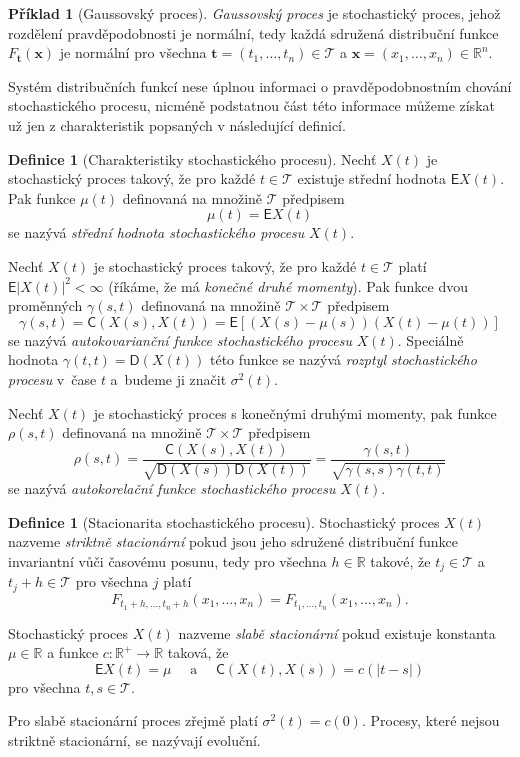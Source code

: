 \documentclass[a4paper,12pt]{report}
\theoremstyle{definition} \newtheorem{definice}[veta]{Definice}
\newtheorem{priklad}{Příklad}
\theoremstyle{remark}
\begin{document}
\begin{priklad}[Gaussovský proces]
\textit{Gaussovský proces} je stochastický proces, jehož rozdělení pravděpodobnosti je normální, tedy každá sdružená distribuční funkce $F_{\boldsymbol{t}}(\boldsymbol{x})$ je normální pro všechna $\boldsymbol{t}=(t_1,\dots,t_n)\in \mathcal{T}$ a $\boldsymbol{x}=(x_1,\dots,x_n)\in \mathbb{R}^n$.
\end{priklad}

Systém distribučních funkcí nese úplnou informaci o pravděpodobnostním chování stochastického procesu, nicméně podstatnou část této informace můžeme získat už jen z charakteristik popsaných v následující definicí.

\begin{definice}[Charakteristiky stochastického procesu]
Nechť $X(t)$ je stochastický proces takový, že pro každé $t\in \mathcal{T}$ existuje střední hodnota $\mathsf{E}{X(t)}$.
Pak funkce $\mu(t)$ definovaná na množině $\mathcal{T}$ předpisem
$$\mu(t)=\mathsf{E}{X(t)}$$
se nazývá \textit{střední hodnota stochastického procesu} $X(t)$.

Nechť $X(t)$ je stochastický proces takový, že pro každé $t\in\mathcal{T}$ platí $\mathsf{E}{|X(t)|^2<\infty}$ (říkáme, že má \textit{konečné druhé momenty}).
Pak funkce dvou proměnných $\gamma(s,t)$ definovaná na množině $\mathcal{T}\times \mathcal{T}$ předpisem
$$\gamma(s,t)=\mathsf{C}(X(s),X(t))=\mathsf{E}{\left[(X(s)-\mu(s))(X(t)-\mu(t))\right]}$$
se nazývá \textit{autokovarianční funkce stochastického procesu} $X(t)$.  
Speciálně hodnota $\gamma(t,t)=\mathsf{D}(X(t))$ této funkce se nazývá \textit{rozptyl stochastického procesu} v~čase $t$ a~budeme ji značit ${\sigma^2(t)}$.

Nechť $X(t)$ je stochastický proces s konečnými druhými momenty,
pak funkce $\rho(s,t)$ definovaná na množině $\mathcal{T}\times\mathcal{T}$ předpisem
$$\rho(s,t)=\frac{\mathsf{C}(X(s),X(t))}{\sqrt{\mathsf{D}(X(s))\mathsf{D}(X(t))}}=\frac{\gamma(s,t)}{\sqrt{\gamma(s,s)\gamma(t,t)}}$$
se nazývá \textit{autokorelační funkce stochastického procesu} $X(t)$.
\end{definice}

\begin{definice}[Stacionarita stochastického procesu]
Stochastický proces $X(t)$ nazveme \textit{striktně stacionární} pokud jsou jeho sdružené distribuční funkce invariantní vůči časovému posunu, tedy pro všechna $h\in\mathbb{R}$ takové, že $t_j\in\mathcal{T}$ a $t_j+h\in\mathcal{T}$ pro všechna $j$ platí
$$F_{t_1+h,\dots,t_n+h}(x_1,\dots,x_n)=F_{t_1,\dots,t_n}(x_1,\dots,x_n).$$   

Stochastický proces $X(t)$ nazveme \textit{slabě stacionární} pokud existuje konstanta $\mu\in\mathbb{R}$ a funkce $c:\mathbb{R}^+\to\mathbb{R}$ taková, že
$$\mathsf{E}{X(t)}=\mu\quad\text{ a }\quad\mathsf{C}(X(t),X(s))=c(|t-s|)$$
pro všechna $t,s\in\mathcal{T}$.
\end{definice}
Pro slabě stacionární proces zřejmě platí $\sigma^2(t)=c(0)$.
Procesy, které nejsou striktně stacionární, se nazývají evoluční. 
\end{document}
